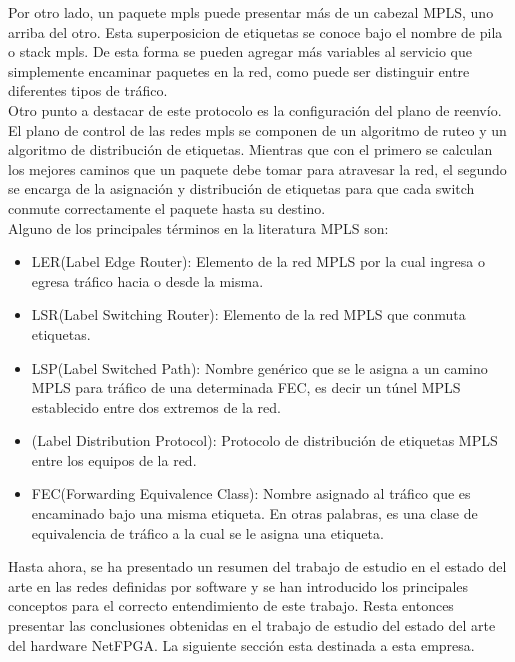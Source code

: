 Por otro lado, un paquete mpls puede presentar más de un cabezal MPLS, uno arriba del otro. Esta superposicion de etiquetas se conoce bajo el nombre de pila o stack mpls. De esta forma se pueden agregar más variables al servicio que simplemente encaminar paquetes en la red, como puede ser distinguir entre diferentes tipos de tráfico.\\

Otro punto a destacar de este protocolo es la configuración del plano de reenvío. El plano de control de las redes mpls se componen de un algoritmo de ruteo y un algoritmo de distribución de etiquetas. Mientras que con el primero se calculan los mejores caminos que un paquete debe tomar para atravesar la red, el segundo se encarga de la asignación y distribución de etiquetas para que cada switch conmute correctamente el paquete hasta su destino.\\

Alguno de los principales términos en la literatura MPLS son:

\begin{itemize}
\item LER(Label Edge Router): Elemento de la red MPLS por la cual ingresa o egresa tráfico hacia o desde la misma.
\item LSR(Label Switching Router): Elemento de la red MPLS que conmuta etiquetas.
\item LSP(Label Switched Path): Nombre genérico que se le asigna a un camino MPLS para tráfico de una determinada FEC, es decir un túnel MPLS establecido entre dos extremos de la red.
\item {}(Label Distribution Protocol): Protocolo de distribución de etiquetas MPLS entre los equipos de la red.
\item FEC(Forwarding Equivalence Class): Nombre asignado al tráfico que es encaminado bajo una misma etiqueta. En otras palabras, es una clase de equivalencia de tráfico a la cual se le asigna una etiqueta.
 
\end{itemize}
\vspace{1cm}

Hasta ahora, se ha presentado un resumen del trabajo de estudio en el estado del arte en las redes definidas por software y se han introducido los principales conceptos para el correcto entendimiento de este trabajo. Resta entonces presentar las conclusiones obtenidas en el trabajo de estudio del estado del arte del hardware NetFPGA. La siguiente secci\'on esta destinada a esta empresa.

